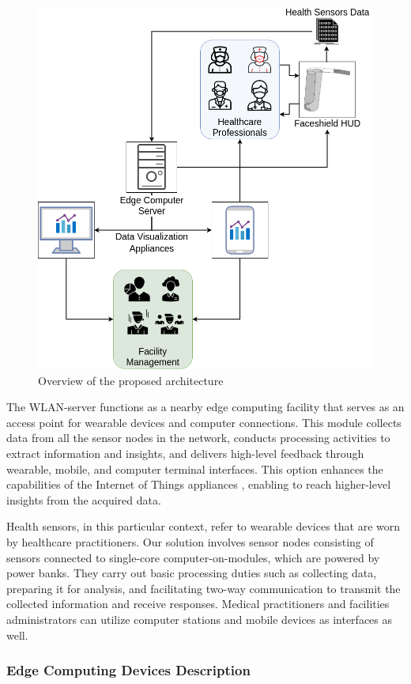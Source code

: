 \begin{figure}[h!]
    \centering
    \includegraphics[width = .6\linewidth]{Figures/general-arch.png}
    \caption{Overview of the proposed architecture}
    \label{fig:gen-arch}
\end{figure}

The WLAN-server functions as a nearby edge computing facility that serves as an access point for wearable devices and computer connections. This module collects data from all the sensor nodes in the network, conducts processing activities to extract information and insights, and delivers high-level feedback through wearable, mobile, and computer terminal interfaces. This option enhances the capabilities of the Internet of Things appliances \cite{chang2017indie}, enabling to reach higher-level insights from the acquired data.

Health sensors, in this particular context, refer to wearable devices that are worn by healthcare practitioners. Our solution involves sensor nodes consisting of sensors connected to single-core computer-on-modules, which are powered by power banks. They carry out basic processing duties such as collecting data, preparing it for analysis, and facilitating two-way communication to transmit the collected information and receive responses. Medical practitioners and facilities administrators can utilize computer stations and mobile devices as interfaces as well.

\subsubsection{Edge Computing Devices Description}


